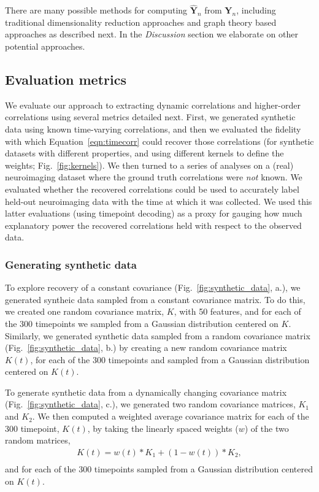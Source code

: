 \documentclass[english]{article}
\begin{document}
There are many possible methods for computing $\hat{\mathbf{Y}}_n$
from $\mathbf{Y}_n$, including traditional dimensionality reduction
approaches and graph theory based approaches as described next.  In the
\textit{Discussion} section we elaborate on other potential approaches.



\subsection*{Evaluation metrics}
We evaluate our approach to extracting dynamic correlations and
higher-order correlations using several metrics detailed next.  First,
we generated synthetic data using known time-varying correlations, and
then we evaluated the fidelity with which Equation~\ref{eqn:timecorr}
could recover those correlations (for synthetic datasets with
different properties, and using different kernels to define the
weights; Fig.~\ref{fig:kernels}).  We then turned to a series of
analyses on a (real) neuroimaging dataset where the ground truth
correlations were \textit{not} known.  We evaluated whether the
recovered correlations could be used to accurately label held-out
neuroimaging data with the time at which it was collected.  We used this latter evaluations (using timepoint
decoding) as a proxy for
gauging how much explanatory power the recovered correlations held
with respect to the observed data.

\subsubsection*{Generating synthetic data}
To explore recovery of a constant covariance (Fig.~\ref{fig:synthetic_data},  a.), we generated syntheic
data sampled from a constant covariance matrix. To do this, we created one random
covariance matrix, $K$, with 50 features, and for each of the 300 timepoints  we
sampled from a Gaussian distribution centered on $K$.  Similarly, we generated synthetic data
sampled from a random covariance matrix (Fig.~\ref{fig:synthetic_data}, b.) by creating a new random
covariance matrix $K(t)$, for each of the 300 timepoints and sampled from a
Gaussian distribution centered on $K(t)$.

To generate synthetic data from a dynamically changing covariance
matrix (Fig.~\ref{fig:synthetic_data},  c.),
we generated two random covariance
matrices, $K_{1}$ and $K_{2}$.  We then computed a weighted average covariance matrix
for each of the 300 timepoint, $K(t)$, 
by taking the linearly spaced weights ($w$) of the two random matrices, 
\begin{align}
K(t) = w(t) * K_{1} + (1 - w(t)) *  K_{2}, \\\label{eqn:ramping}
\end{align}
and for each of the 300 timepoints sampled from a
Gaussian distribution centered on $K(t)$.
\end{document}
